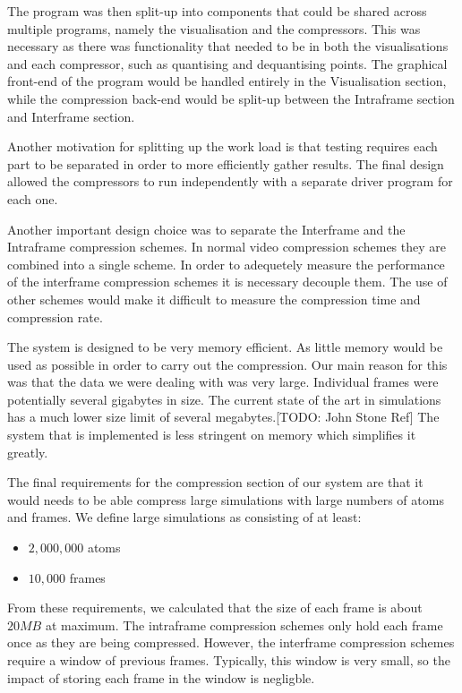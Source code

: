 \documentclass[a4paper,11pt]{report}
\begin{document}
The program was then split-up into components that could be shared across multiple programs, namely the visualisation and the compressors. This was necessary as there was functionality that needed to be in both the visualisations and each compressor, such as quantising and dequantising points. The graphical front-end of the program would be handled entirely in the Visualisation section, while the compression back-end would be split-up between the Intraframe section and Interframe section. 

Another motivation for splitting up the work load is that testing requires each part to be separated in order to more efficiently gather results. The final design allowed the compressors to run independently with a separate driver program for each one.

Another important design choice was to separate the Interframe and the Intraframe compression schemes. In normal video compression schemes they are combined into a single scheme. In order to adequetely measure the performance of the interframe compression schemes it is necessary decouple them. The use of other schemes would make it difficult to measure the compression time and compression rate. 
 
The system is designed to be very memory efficient. As little memory would be used as possible in order to carry out the compression. Our main reason for this was that the data we were dealing with was very large. Individual frames were potentially several gigabytes in size. The current state of the art in simulations has a much lower size limit of several megabytes.[TODO: John Stone Ref] The system that is implemented is less stringent on memory which simplifies it greatly.

The final requirements for the compression section of our system are that it would needs to be able compress large simulations with large numbers of atoms and frames. We define large simulations as consisting of at least:

\begin{itemize}
 \item $2,000,000$ atoms
 \item $10,000$ frames
\end{itemize}

From these requirements, we calculated that the size of each frame is about $20MB$ at maximum. The intraframe compression schemes only hold each frame once as they are being compressed. However, the interframe compression schemes require a window of previous frames. Typically, this window is very small, so the impact of storing each frame in the window is negligble.
\end{document}
